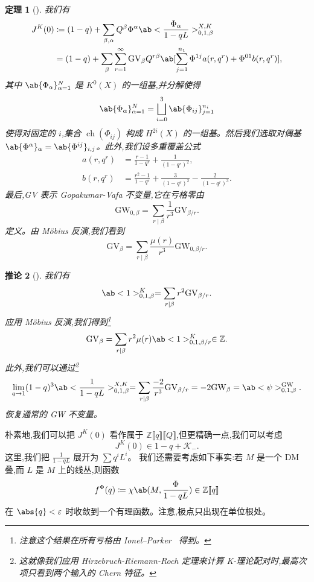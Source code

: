 \documentclass{amsart}
\newtheorem{thm}{定理}[section]
\newtheorem{cor}[thm]{推论}
\theoremstyle{definition}
\theoremstyle{remark}
\theoremstyle{plain}
\theoremstyle{definition}
\theoremstyle{remark}
\newcommand{\Z}{\mathbb{Z}}
\newcommand{\ep}{\varepsilon}
\newcommand{\mc}[1]{\mathcal{#1}}
\newcommand{\mr}[1]{\mathrm{#1}}
\newcommand{\1}{\mathbf{1}}
\newcommand{\2}{\mathbf{2}}
\newcommand{\3}{\mathbf{3}}
\newcommand{\ps}[1]{\llbracket #1 \rrbracket}
\DeclareMathOperator{\ch}{ch}
\begin{document}
\begin{thm}[{\cite{ChouLee2025}}]
    我们有
    \begin{align*}
        J^K(0) &\coloneqq (1-q) + \sum_{\beta, \alpha} Q^{\beta} \Phi^{\alpha} \ab<\frac{\Phi_{\alpha}}{1-qL}>_{0,1,\beta}^{X,K} \\
        &= (1-q) + \sum_{\beta} \sum_{r=1}^{\infty} \mr{GV}_{\beta} Q^{r\beta} \ab[\sum_{j=1}^{n_1} \Phi^{1j} a(r, q^r) + \Phi^{01} b(r, q^r)],
    \end{align*}
    其中 \(\ab\{\Phi_{\alpha}\}_{\alpha=1}^N\) 是 \(K^0(X)\) 的一组基,并分解使得
    \[ \ab\{\Phi_{\alpha}\}_{\alpha=1}^N = \bigsqcup_{i=0}^3 \ab\{\Phi_{ij}\}_{j=1}^{n_i} \]
    使得对固定的 \(i\),集合 \(\ch(\Phi_{ij})\) 构成 \(H^{2i}(X)\) 的一组基。然后我们选取对偶基 \(\ab\{\Phi^{\alpha}\}_{\alpha} = \ab\{\Phi^{ij}\}_{i,j}\)。此外,我们设多重覆盖公式
    \begin{align*}
        a(r, q^r) &= \frac{r-1}{1-q^r} + \frac{1}{(1-q^r)^2}, \\
        b(r, q^r) &= \frac{r^2-1}{1-q^r} + \frac{3}{(1-q^r)^2} - \frac{2}{(1-q^r)^3}.
    \end{align*}
    最后,GV 表示 Gopakumar-Vafa 不变量,它在亏格零由
    \[ \mr{GW}_{0,\beta} = \sum_{r \mid \beta} \frac{1}{r^3} \mr{GV}_{\beta/r}. \]
    定义。由 Möbius 反演,我们看到
    \[ \mr{GV}_{\beta} = \sum_{r \mid \beta} \frac{\mu(r)}{r^3} \mr{GW}_{0,\beta/r}. \]
\end{thm}

\begin{cor}[{\cite{ChouLee2025}}]
    我们有
    \[ \ab<1>_{0,1,\beta}^K = \sum_{r \mid \beta} r^2 \mr{GV}_{\beta/r}. \]
    应用 Möbius 反演,我们得到\footnote{注意这个结果在所有亏格由 Ionel--Parker~\cite{IonelParker2018} 得到。}
    \[ \mr{GV}_{\beta} = \sum_{r \mid \beta} r^2 \mu(r) \ab<1>_{0,1,\beta/r}^K \in \Z. \]
    此外,我们可以通过\footnote{这就像我们应用 Hirzebruch-Riemann-Roch 定理来计算 K-理论配对时,最高次项只看到两个输入的 Chern 特征。}
    \[ \lim_{q \to 1} (1-q)^3 \ab<\frac{1}{1-qL}>_{0,1,\beta}^{X,K} = \sum_{r \mid \beta} \frac{-2}{r^3} \mr{GV}_{\beta/r} = -2 \mr{GW}_{\beta} = \ab<\psi>_{0,1,\beta}^{\mr{GW}}. \]
    恢复通常的 GW 不变量。
\end{cor}

朴素地,我们可以把 \(J^K(0)\) 看作属于 \(\Z\ps{q}\ps{Q}\),但更精确一点,我们可以考虑
\[ J^K(0) \in 1-q + \mc{K}_-. \]
这里,我们把 \(\frac{1}{1-qL}\) 展开为 \(\sum q^i L^i\)。
我们还需要考虑如下事实:若 \(M\) 是一个 DM 叠,而 \(L\) 是 \(M\) 上的线丛,则函数
\[ f^{\Phi}(q) \coloneqq \chi\ab(M, \frac{\Phi}{1-qL}) \in \Z \ps{q} \]
在 \(\abs{q} < \ep\) 时收敛到一个有理函数。注意,极点只出现在单位根处。
\end{document}
